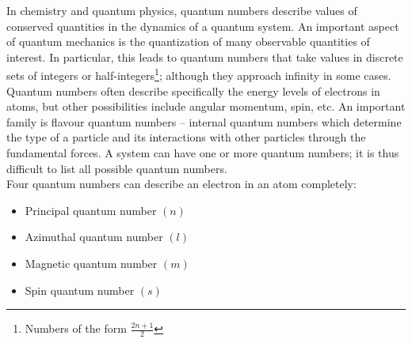 
\begin{chembox}{}
{In chemistry and quantum physics, quantum numbers describe values of conserved quantities in the dynamics of a quantum system. 
An important aspect of quantum mechanics is the quantization of many observable quantities of interest. In particular, this leads to quantum numbers that take values in discrete sets of integers or half-integers\footnote{Numbers of the form $\frac{2n+1}{2}$}; although they approach infinity in some cases. Quantum numbers often describe specifically the energy levels of electrons in atoms, but other possibilities include angular momentum, spin, etc. An important family is flavour quantum numbers – internal quantum numbers which determine the type of a particle and its interactions with other particles through the fundamental forces. A system can have one or more quantum numbers; it is thus difficult to list all possible quantum numbers.\\
Four quantum numbers can describe an electron in an atom completely:
\begin{itemize}
    \item{Principal quantum number $(n)$}
    \item{Azimuthal quantum number $(l)$}
    \item{Magnetic quantum number $(m)$}
    \item{Spin quantum number $(s)$}
\end{itemize}}
\end{chembox}
